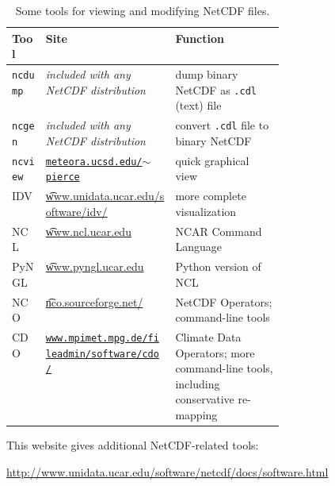 \newcommand{\netcdftool}[1]{#1\index{NetCDF!tools!#1}}
\begin{table}[ht]
\centering
\caption{Some tools for viewing and modifying NetCDF files.}\label{tab:NetCDFview} 
\small
\begin{tabular}{llp{0.4\linewidth}}
  \\\toprule
  \textbf{Tool} & \textbf{Site} & \textbf{Function}\\ \midrule
\netcdftool{\texttt{ncdump}} & \emph{included with any NetCDF distribution} & dump binary NetCDF as \texttt{.cdl} (text) file \\
\netcdftool{\texttt{ncgen}} & \emph{included with any NetCDF distribution} & convert \texttt{.cdl} file to binary NetCDF \\
\netcdftool{\texttt{ncview}} & \href{http://meteora.ucsd.edu/~pierce/ncview_home_page.html}{\texttt{meteora.ucsd.edu/$\sim$pierce}} & quick graphical view \\
\netcdftool{IDV} & \href{http://www.unidata.ucar.edu/software/idv/}{\t{www.unidata.ucar.edu/software/idv/}} & more complete visualization \\
\netcdftool{NCL} &  \href{http://www.ncl.ucar.edu}{\t{www.ncl.ucar.edu}} & NCAR Command Language\\
\netcdftool{PyNGL} &  \href{http://www.pyngl.ucar.edu}{\t{www.pyngl.ucar.edu}} & Python version of NCL\\
\netcdftool{NCO}\index{NCO (NetCDF Operators)} & \href{http://nco.sourceforge.net/}{\t{nco.sourceforge.net/}} & NetCDF Operators; command-line tools\\
\netcdftool{CDO} & \href{http://www.mpimet.mpg.de/fileadmin/software/cdo/}{\texttt{www.mpimet.mpg.de/fileadmin/software/cdo/}} & Climate Data Operators; more command-line tools, including conservative re-mapping
\\\bottomrule
\end{tabular}
\normalsize
\end{table}

This website gives additional NetCDF-related tools:

\centerline{ \url{http://www.unidata.ucar.edu/software/netcdf/docs/software.html} } 




